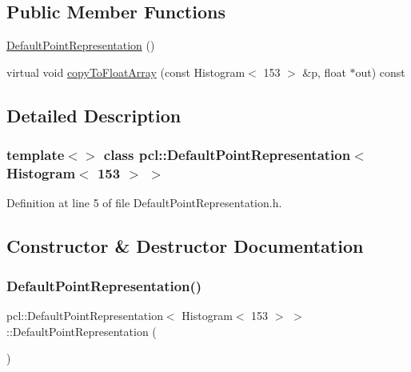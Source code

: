 \subsection*{Public Member Functions}
\begin{DoxyCompactItemize}
\item 
\hyperlink{classpcl_1_1_default_point_representation_3_01_histogram_3_01153_01_4_01_4_af423b3d8c452288ca14a44e97173c8bb}{Default\+Point\+Representation} ()
\item 
virtual void \hyperlink{classpcl_1_1_default_point_representation_3_01_histogram_3_01153_01_4_01_4_aa87167229f126da0b0ccff89887875ac}{copy\+To\+Float\+Array} (const Histogram$<$ 153 $>$ \&p, float $\ast$out) const
\end{DoxyCompactItemize}


\subsection{Detailed Description}
\subsubsection*{template$<$$>$\newline
class pcl\+::\+Default\+Point\+Representation$<$ Histogram$<$ 153 $>$ $>$}



Definition at line 5 of file Default\+Point\+Representation.\+h.



\subsection{Constructor \& Destructor Documentation}
\mbox{\label{classpcl_1_1_default_point_representation_3_01_histogram_3_01153_01_4_01_4_af423b3d8c452288ca14a44e97173c8bb}} 
\subsubsection{\texorpdfstring{Default\+Point\+Representation()}{DefaultPointRepresentation()}}
{\footnotesize\ttfamily pcl\+::\+Default\+Point\+Representation$<$ Histogram$<$ 153 $>$ $>$\+::Default\+Point\+Representation (\begin{DoxyParamCaption}{ }\end{DoxyParamCaption})\hspace{0.3cm}{\ttfamily [inline]}}



